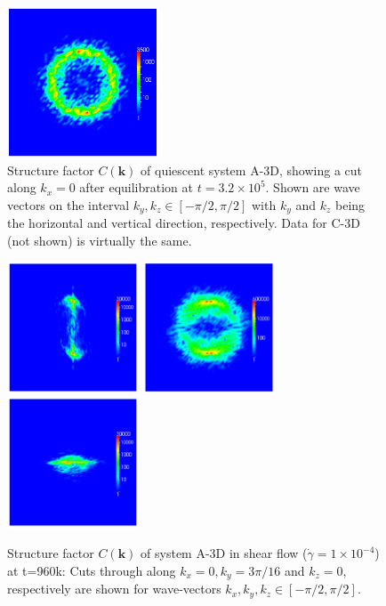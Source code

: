 \documentclass[8.5pt,twoside,twocolumn]{article}
\newcommand{\e}[1]{\times10^{#1}}
\begin{document}
\begin{figure}[htp!]
\centering
\includegraphics[angle=0,width=0.40\textwidth]{ck_y-slice_run786_320.jpg}
\caption{Structure factor $C({\mathbf k})$ of quiescent system A-3D, showing a cut along $k_x=0$ after equilibration at $t=3.2\e{5}$. Shown are wave vectors on the interval $k_y, k_z\in[-\pi/2 ,\pi/2 ]$ with $k_y$ and $k_z$ being the horizontal and vertical direction, respectively. Data for C-3D (not shown) is virtually the same.}
\label{fig11}
\end{figure}

\begin{figure}[htp!]
\centering
\includegraphics[angle=0,width=0.35\textwidth]{ck_x-slice_run788_960.jpg}
\includegraphics[angle=0,width=0.35\textwidth]{ck_y-slice_run788_960.jpg}
\includegraphics[angle=0,width=0.35\textwidth]{ck_z-slice_run788_960.jpg}
\caption{Structure factor $C({\mathbf k})$ of system A-3D in shear flow ($\dot{\gamma}=1\times10^{-4}$) at t=960k: Cuts through along $k_x=0,k_y=3\pi/16$ and $k_z=0$, respectively are shown for wave-vectors $k_x, k_y, k_z\in[-\pi/2 ,\pi/2]$.}
\label{fig12}
\end{figure}
\end{document}
